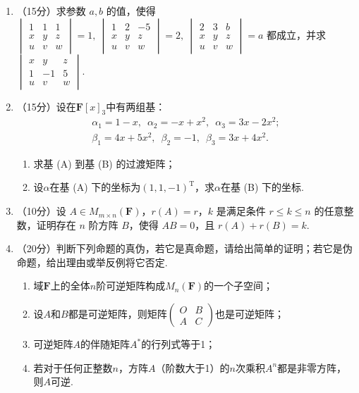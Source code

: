 \begin{enumerate}
    \item （15分）求参数 $a,b$  的值，使得 $\begin{vmatrix}1 & 1 & 1 \\ x & y & z \\u & v & w\end{vmatrix}=1,\ \begin{vmatrix}1 & 2 & -5 \\ x & y & z \\u & v & w\end{vmatrix}=2,\ \begin{vmatrix}2 & 3 & b \\ x & y & z \\u & v & w\end{vmatrix}=a$ 都成立，并求$\begin{vmatrix}x & y & z \\ 1 & -1 & 5 \\u & v & w\end{vmatrix}$.

    \item （15分）设在$\mathbf{F}[x]_3$中有两组基：
    \begin{gather}
        \alpha_1=1-x,\enspace\alpha_2=-x+x^2,\enspace\alpha_3=3x-2x^2; \tag{A} \\
        \beta_1=4x+5x^2,\enspace\beta_2=-1,\enspace\beta_3=3x+4x^2. \tag{B}
    \end{gather}
    \begin{enumerate}
        \item 求基 (A) 到基 (B) 的过渡矩阵；

        \item 设$\alpha$在基 (A) 下的坐标为$(1,1,-1)^{\mathrm{T}}$，求$\alpha$在基 (B) 下的坐标.
    \end{enumerate}

    \item （10分）设 $A \in M_{m \times n}(\mathbf{F})$，$r(A)=r$，$k$ 是满足条件 $r \leqslant k \leqslant n$ 的任意整数，证明存在 $n$ 阶方阵 $B$，使得 $AB=0$，且 $r(A)+r(B)=k$.

    \item （20分）判断下列命题的真伪，若它是真命题，请给出简单的证明；若它是伪命题，给出理由或举反例将它否定.
    \begin{enumerate}
        \item 域$\mathbf{F}$上的全体$n$阶可逆矩阵构成$M_n(\mathbf{F})$的一个子空间；

        \item 设$A$和$B$都是可逆矩阵，则矩阵$\begin{pmatrix}
            O & B \\ A & C
        \end{pmatrix}$也是可逆矩阵；

        \item 可逆矩阵$A$的伴随矩阵$A^*$的行列式等于1；

        \item 若对于任何正整数$n$，方阵$A$（阶数大于1）的$n$次乘积$A^n$都是非零方阵，则$A$可逆.
    \end{enumerate}
\end{enumerate}

\clearpage
